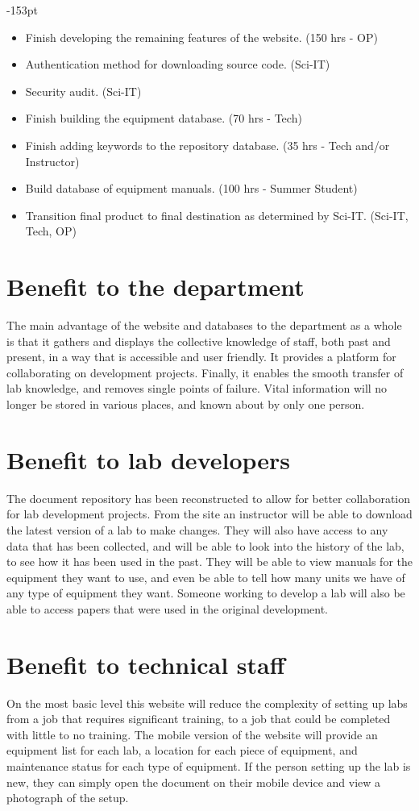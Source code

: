 \begin{adjustwidth}{}{-153pt}
\begin{itemize}
\item Finish developing the remaining features of the website. (150 hrs - OP)
\item Authentication method for downloading source code. (Sci-IT)
\item Security audit. (Sci-IT)
\item Finish building the equipment database. (70 hrs - Tech)
\item Finish adding keywords to the repository database. (35 hrs - Tech and/or Instructor)
\item Build database of equipment manuals. (100 hrs - Summer Student)
\item Transition final product to final destination as determined by Sci-IT. (Sci-IT, Tech, OP)
\end{itemize}


\section{\bf Benefit to the department}

The main advantage of the website and databases to the department as a whole is that it gathers and displays the collective knowledge of staff, both past and present, in a way that is accessible and user friendly. It provides a platform for collaborating on development projects. Finally, it enables the smooth transfer of lab knowledge, and removes single points of failure. Vital information will no longer be stored in various places, and known about by only one person.

\section{\bf Benefit to lab developers}
The document repository has been reconstructed to allow for better collaboration for lab development projects. From the site an instructor will be able to download the latest version of a lab to make changes. They will also have access to any data that has been collected, and will be able to look into the history of the lab, to see how it has been used in the past. They will be able to view manuals for the equipment they want to use, and even be able to tell how many units we have of any type of equipment they want. Someone working to develop a lab will also be able to access papers that were used in the original development.

\section{\bf Benefit to technical staff}
On the most basic level this website will reduce the complexity of setting up labs from a job that requires significant training, to a job that could be completed with little to no training. The mobile version of the website will provide an equipment list for each lab, a location for each piece of equipment, and maintenance status for each type of equipment. If the person setting up the lab is new, they can simply open the document on their mobile device and view a photograph of the setup. 


\end{adjustwidth}

